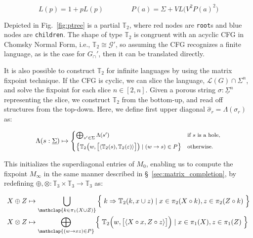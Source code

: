 \documentclass[runningheads]{llncs}
\begin{document}
  \begin{equation}
    L(p) = 1 + p L(p) \phantom{addspace} P(a) = \Sigma + V L\big(V^2P(a)^2\big)
  \end{equation}

  Depicted in Fig.~\ref{fig:ptree} is a partial $\mathbb{T}_2$, where red nodes are \texttt{root}s and blue nodes are \texttt{children}. The shape of type $\mathbb{T}_2$ is congruent with an acyclic CFG in Chomsky Normal Form, i.e., $\mathbb{T}_2\cong\mathcal{G}'$, so assuming the CFG recognizes a finite language, as is the case for $G_\cap'$, then it can be translated directly.%

  It is also possible to construct $\mathbb{T}_2$ for infinite languages by using the matrix fixpoint technique. If the CFG is cyclic, we can slice the language, $\mathcal{L}(G)\cap \Sigma^n$, and solve the fixpoint for each slice $n \in [2, n]$. Given a porous string $\sigma: \underline\Sigma^n$ representing the slice, we construct $\mathbb{T}_2$ from the bottom-up, and read off structures from the top-down. Here, we define first upper diagonal $\hat\sigma_r = \Lambda(\sigma_r)$ as:

\vspace{-5pt}\begin{equation}
  \begin{footnotesize}
\Lambda(s: \underline\Sigma) \mapsto \begin{cases}
\bigoplus_{s'\in \Sigma} \Lambda(s') & \text{if $s$ is a hole,} \vspace{5pt}\\
\big\{\mathbb{T}_2\big(w, \big[\langle\mathbb{T}_2(s), \mathbb{T}_2(\varepsilon)\rangle\big]\big) \mid (w \rightarrow s)\in P\big\} & \text{otherwise.}
\end{cases}
  \end{footnotesize}
\end{equation}

\noindent This initializes the superdiagonal entries of $M_0$, enabling us to compute the fixpoint $M_\infty$ in the same manner described in \S~\ref{sec:matrix_completion}, by redefining $\oplus, \otimes: \mathbb{T}_3 \times \mathbb{T}_3 \rightarrow \mathbb{T}_3$ as:

\vspace{-5pt}\begin{align}
  X \oplus Z &\mapsto \bigcup_{\mathclap{k\in \pi_1(X \cup Z)}}\Big\{\phantom{.}k \Rightarrow \mathbb{T}_2(k, x \cup z) \mid x \in \pi_2(X\circ k), z \in \pi_2(Z\circ k)\phantom{.}\Big\}\\
  X \otimes Z &\mapsto \bigoplus_{\mathclap{(w\rightarrow xz) \in P}}\Big\{\phantom{.}\mathbb{T}_2\Big(w, \big[\langle X\circ x, Z\circ z\rangle\big]\Big) \mid x \in \pi_1(X), z \in \pi_1(Z)\phantom{.}\Big\}
\end{align}
\end{document}

